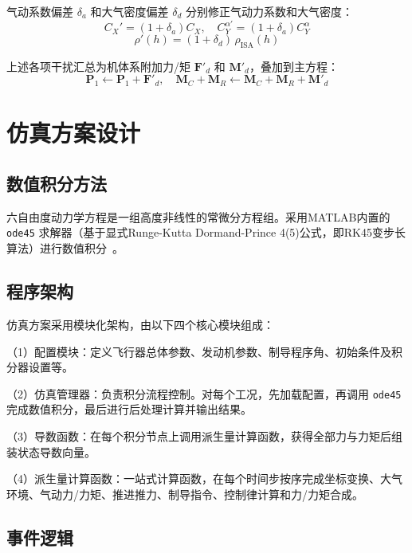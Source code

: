 气动系数偏差 $\delta_a$ 和大气密度偏差 $\delta_d$ 分别修正气动力系数和大气密度：
\begin{equation}
C_X'=(1+\delta_a)C_X,\quad
C_Y^{\alpha\prime}=(1+\delta_a)C_Y^\alpha 
\end{equation}
\begin{equation}
\rho'(h)=(1+\delta_d)\,\rho_{\mathrm{ISA}}(h) 
\end{equation}

上述各项干扰汇总为机体系附加力/矩 $\mathbf F'_d$ 和 $\mathbf M'_d$，叠加到主方程：
\begin{equation}
\mathbf P_1\leftarrow\mathbf P_1+\mathbf F'_d,\quad
\mathbf M_C+\mathbf M_R\leftarrow\mathbf M_C+\mathbf M_R+\mathbf M'_d 
\end{equation}

\section{仿真方案设计}

\subsection{数值积分方法}

六自由度动力学方程是一组高度非线性的常微分方程组。采用MATLAB内置的 \texttt{ode45} 求解器（基于显式Runge-Kutta Dormand-Prince 4(5)公式，即RK45变步长算法）进行数值积分~\cite{薛源2016}。

\subsection{程序架构}

 仿真方案采用模块化架构，由以下四个核心模块组成：

（1）配置模块：定义飞行器总体参数、发动机参数、制导程序角、初始条件及积分器设置等。

（2）仿真管理器：负责积分流程控制。对每个工况，先加载配置，再调用 \texttt{ode45} 完成数值积分，最后进行后处理计算并输出结果。

（3）导数函数：在每个积分节点上调用派生量计算函数，获得全部力与力矩后组装状态导数向量。

（4）派生量计算函数：一站式计算函数，在每个时间步按序完成坐标变换、大气环境、气动力/力矩、推进推力、制导指令、控制律计算和力/力矩合成。

\subsection{事件逻辑}

